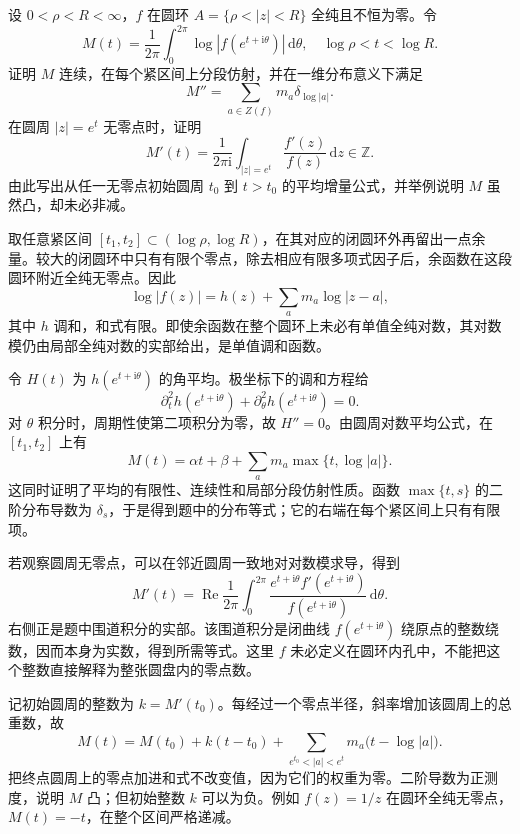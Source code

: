 \begin{exercise}[圆环上的对数平均]\label{b3:ex:18-draft-01}
设 \(0<\rho<R<\infty\)，\(f\) 在圆环 \(A=\{\rho<|z|<R\}\) 全纯且不恒为零。令
\[
 M(t)=\frac1{2\pi}\int_0^{2\pi}\log|f(e^{t+\mathrm i\theta})|\,\mathrm d\theta,
 \quad \log\rho<t<\log R.
\]
证明 \(M\) 连续，在每个紧区间上分段仿射，并在一维分布意义下满足
\[
 M''=\sum_{a\in Z(f)}m_a\delta_{\log|a|}.
\]
在圆周 \(|z|=e^t\) 无零点时，证明
\[
 M'(t)=\frac1{2\pi\mathrm i}\int_{|z|=e^t}\frac{f'(z)}{f(z)}\,\mathrm dz\in\mathbb Z.
\]
由此写出从任一无零点初始圆周 \(t_0\) 到 \(t>t_0\) 的平均增量公式，并举例说明 \(M\) 虽然凸，却未必非减。
\end{exercise}
\begin{solution}
取任意紧区间 \([t_1,t_2]\subset(\log\rho,\log R)\)，在其对应的闭圆环外再留出一点余量。较大的闭圆环中只有有限个零点，除去相应有限多项式因子后，余函数在这段圆环附近全纯无零点。因此
\[
 \log|f(z)|=h(z)+\sum_a m_a\log|z-a|,
\]
其中 \(h\) 调和，和式有限。即使余函数在整个圆环上未必有单值全纯对数，其对数模仍由局部全纯对数的实部给出，是单值调和函数。

令 \(H(t)\) 为 \(h(e^{t+\mathrm i\theta})\) 的角平均。极坐标下的调和方程给
\[
 \partial_t^2h(e^{t+\mathrm i\theta})
 +\partial_\theta^2h(e^{t+\mathrm i\theta})=0.
\]
对 \(\theta\) 积分时，周期性使第二项积分为零，故 \(H''=0\)。由圆周对数平均公式，在 \([t_1,t_2]\) 上有
\[
 M(t)=\alpha t+\beta+\sum_a m_a\max\{t,\log|a|\}.
\]
这同时证明了平均的有限性、连续性和局部分段仿射性质。函数 \(\max\{t,s\}\) 的二阶分布导数为 \(\delta_s\)，于是得到题中的分布等式；它的右端在每个紧区间上只有有限项。

若观察圆周无零点，可以在邻近圆周一致地对对数模求导，得到
\[
 M'(t)=\operatorname{Re}\frac1{2\pi}
 \int_0^{2\pi}\frac{e^{t+\mathrm i\theta}f'(e^{t+\mathrm i\theta})}
 {f(e^{t+\mathrm i\theta})}\,\mathrm d\theta.
\]
右侧正是题中围道积分的实部。该围道积分是闭曲线 \(f(e^{t+\mathrm i\theta})\) 绕原点的整数绕数，因而本身为实数，得到所需等式。这里 \(f\) 未必定义在圆环内孔中，不能把这个整数直接解释为整张圆盘内的零点数。

记初始圆周的整数为 \(k=M'(t_0)\)。每经过一个零点半径，斜率增加该圆周上的总重数，故
\[
 M(t)=M(t_0)+k(t-t_0)
 +\sum_{e^{t_0}<|a|<e^t}m_a\bigl(t-\log|a|\bigr).
\]
把终点圆周上的零点加进和式不改变值，因为它们的权重为零。二阶导数为正测度，说明 \(M\) 凸；但初始整数 \(k\) 可以为负。例如 \(f(z)=1/z\) 在圆环全纯无零点，\(M(t)=-t\)，在整个区间严格递减。
\end{solution}

